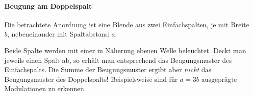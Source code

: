 \paragraph{Beugung am Doppelspalt}%
Die betrachtete Anordnung ist eine Blende aus zwei Einfachspalten, je mit
Breite $b$, nebeneinander mit Spaltabstand
$a$.

Beide Spalte werden mit einer in Näherung ebenen Welle
beleuchtet. Deckt man jeweils einen Spalt ab, so erhält man entsprechend das
Beugungsmuster des Einfachspalts. Die Summe der Beugungsmuster ergibt
aber \emph{nicht} das Beugungsmuster des Doppelspalts!
Beispielsweise sind für $a=3b$ ausgeprägte Modulationen zu erkennen.


